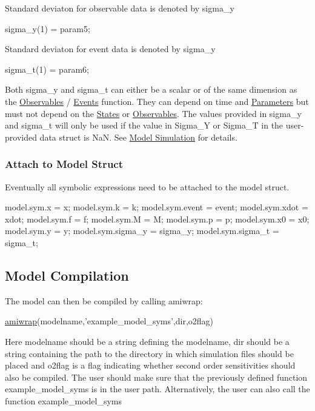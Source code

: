 Standard deviaton for observable data is denoted by sigma\+\_\+y


\begin{DoxyCode}
sigma\_y(1) = param5; 
\end{DoxyCode}


Standard deviaton for event data is denoted by sigma\+\_\+y


\begin{DoxyCode}
sigma\_t(1) = param6; 
\end{DoxyCode}


Both sigma\+\_\+y and sigma\+\_\+t can either be a scalar or of the same dimension as the \hyperlink{def_simu_observables}{Observables} / \hyperlink{def_simu_events}{Events} function. They can depend on time and \hyperlink{def_simu_parameters}{Parameters} but must not depend on the \hyperlink{def_simu_states}{States} or \hyperlink{def_simu_observables}{Observables}. The values provided in sigma\+\_\+y and sigma\+\_\+t will only be used if the value in Sigma\+\_\+\+Y or Sigma\+\_\+\+T in the user-\/provided data struct is Na\+N. See \hyperlink{def_simu_simulation}{Model Simulation} for details.\hypertarget{def_simu_attach}{}\subsubsection{Attach to Model Struct}\label{def_simu_attach}
Eventually all symbolic expressions need to be attached to the model struct.


\begin{DoxyCode}
model.sym.x = x;
model.sym.k = k;
model.sym.event = event;
model.sym.xdot = xdot;
model.sym.f = f;
model.sym.M = M; %
model.sym.p = p;
model.sym.x0 = x0;
model.sym.y = y;
model.sym.sigma\_y = sigma\_y;
model.sym.sigma\_t = sigma\_t;
\end{DoxyCode}
\hypertarget{def_simu_compilation}{}\subsection{Model Compilation}\label{def_simu_compilation}
The model can then be compiled by calling amiwrap\+:


\begin{DoxyCode}
\hyperlink{amiwrap_8m_a183dd11adc4bd525147faa2590ea325b}{amiwrap}(modelname,\textcolor{stringliteral}{'example\_model\_syms'},dir,o2flag)
\end{DoxyCode}


Here modelname should be a string defining the modelname, dir should be a string containing the path to the directory in which simulation files should be placed and o2flag is a flag indicating whether second order sensitivities should also be compiled. The user should make sure that the previously defined function \textquotesingle{}example\+\_\+model\+\_\+syms\textquotesingle{} is in the user path. Alternatively, the user can also call the function \textquotesingle{}example\+\_\+model\+\_\+syms\textquotesingle{}


